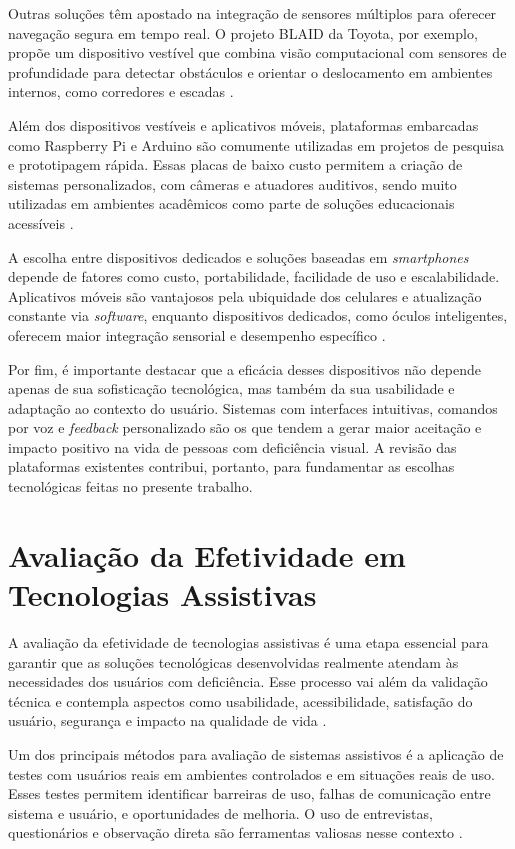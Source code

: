 Outras soluções têm apostado na integração de sensores múltiplos para oferecer navegação segura em tempo real. O projeto BLAID da Toyota, por exemplo, propõe um dispositivo vestível que combina visão computacional com sensores de profundidade para detectar obstáculos e orientar o deslocamento em ambientes internos, como corredores e escadas \cite{Toyota2018}.

Além dos dispositivos vestíveis e aplicativos móveis, plataformas embarcadas como Raspberry Pi e Arduino são comumente utilizadas em projetos de pesquisa e prototipagem rápida. Essas placas de baixo custo permitem a criação de sistemas personalizados, com câmeras e atuadores auditivos, sendo muito utilizadas em ambientes acadêmicos como parte de soluções educacionais acessíveis \cite{Pino2020}.

A escolha entre dispositivos dedicados e soluções baseadas em \textit{smartphones} depende de fatores como custo, portabilidade, facilidade de uso e escalabilidade. Aplicativos móveis são vantajosos pela ubiquidade dos celulares e atualização constante via \textit{software}, enquanto dispositivos dedicados, como óculos inteligentes, oferecem maior integração sensorial e desempenho específico \cite{Saeedi2021}.

Por fim, é importante destacar que a eficácia desses dispositivos não depende apenas de sua sofisticação tecnológica, mas também da sua usabilidade e adaptação ao contexto do usuário. Sistemas com interfaces intuitivas, comandos por voz e \textit{feedback} personalizado são os que tendem a gerar maior aceitação e impacto positivo na vida de pessoas com deficiência visual. A revisão das plataformas existentes contribui, portanto, para fundamentar as escolhas tecnológicas feitas no presente trabalho.

\section{\textbf{Avaliação da Efetividade em Tecnologias Assistivas}}
A avaliação da efetividade de tecnologias assistivas é uma etapa essencial para garantir que as soluções tecnológicas desenvolvidas realmente atendam às necessidades dos usuários com deficiência. Esse processo vai além da validação técnica e contempla aspectos como usabilidade, acessibilidade, satisfação do usuário, segurança e impacto na qualidade de vida \cite{Wentz2013}.

Um dos principais métodos para avaliação de sistemas assistivos é a aplicação de testes com usuários reais em ambientes controlados e em situações reais de uso. Esses testes permitem identificar barreiras de uso, falhas de comunicação entre sistema e usuário, e oportunidades de melhoria. O uso de entrevistas, questionários e observação direta são ferramentas valiosas nesse contexto \cite{Kintsch2002}.

